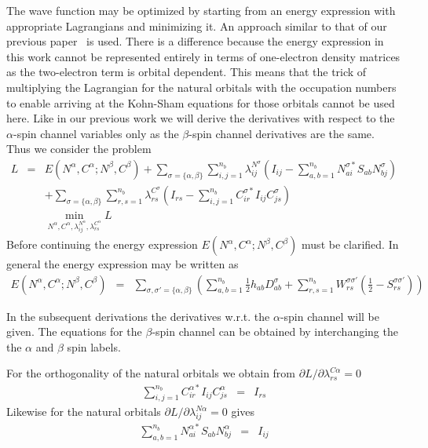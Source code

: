 \documentclass[pra]{revtex4-1}
\begin{document}
The wave function may be optimized by starting from an energy expression with appropriate
Lagrangians and minimizing it. An approach similar to that of our previous
paper~\cite{van_Dam_2016} is used. There is a difference because the energy expression in
this work cannot be represented entirely in terms of one-electron density matrices as
the two-electron term is orbital dependent. This means that the trick of multiplying
the Lagrangian for the natural orbitals with the occupation numbers to enable arriving
at the Kohn-Sham equations for those orbitals cannot be used here. Like in our previous
work we will derive the derivatives with respect to the $\alpha$-spin channel variables
only as the $\beta$-spin channel derivatives are the same. Thus we consider the
problem
\begin{eqnarray}
  L &=&
  E(N^\alpha,C^\alpha;N^\beta,C^\beta)
  + \sum_{\sigma=\{\alpha,\beta\}}\sum_{i,j=1}^{n_b}\lambda^{N^\sigma}_{ij}
    \left(I_{ij}-\sum_{a,b=1}^{n_b}N^{\sigma*}_{ai}S_{ab}N^\sigma_{bj}\right) 
    \nonumber \\
  &&+ \sum_{\sigma=\{\alpha,\beta\}}\sum_{r,s=1}^{n_b}\lambda^{C^\sigma}_{rs}
      \left(I_{rs}-\sum_{i,j=1}^{n_b}C^{\sigma*}_{ir}I_{ij}C^\sigma_{js}\right) \\
  && \min_{N^\alpha,C^\alpha,\lambda^{N^\alpha}_{ij},\lambda^{C^\alpha}_{rs}} L
\end{eqnarray}
Before continuing the energy expression $E(N^\alpha,C^\alpha;N^\beta,C^\beta)$
must be clarified. In general the energy expression may be written as
\begin{eqnarray}
  E(N^\alpha,C^\alpha;N^\beta,C^\beta)
  &=& \sum_{\sigma,\sigma'=\{\alpha,\beta\}}
      \left(\sum_{a,b=1}^{n_b}\frac{1}{2}h_{ab}D^\sigma_{ab}
   +  \sum_{r,s=1}^{n_b}W^{\sigma\sigma'}_{rs}
      \left(\frac{1}{2}-S^{\sigma\sigma'}_{rs}\right)\right)
  \label{Eq:ENC}
\end{eqnarray}

In the subsequent derivations the derivatives w.r.t. the $\alpha$-spin channel will be
given. The equations for the $\beta$-spin channel can be obtained by interchanging the
the $\alpha$ and $\beta$ spin labels.

For the orthogonality of the natural orbitals we obtain from
$\partial L/\partial\lambda^{C\alpha}_{rs} = 0$
\begin{eqnarray}
  \sum_{i,j=1}^{n_b}C^{\alpha*}_{ir}I_{ij}C^\alpha_{js} &=& I_{rs}
\end{eqnarray}
Likewise for the natural orbitals
$\partial L/\partial\lambda^{N\alpha}_{ij} = 0$ gives
\begin{eqnarray}
  \sum_{a,b=1}^{n_b}N^{\alpha*}_{ai}S_{ab}N^\alpha_{bj} &=& I_{ij}
\end{eqnarray}
\end{document}
